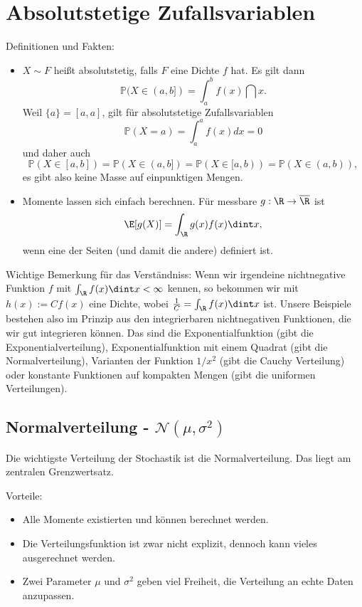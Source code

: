 \section{Absolutstetige Zufallsvariablen}
Definitionen und Fakten:
\begin{itemize}
	\item $X\sim F$ hei\ss t absolutstetig, falls $F$ eine Dichte $f$ hat. Es gilt dann $$\mathbb P(X\in (a,b])=\int_a^b f(x)\dint x.$$
	Weil $\{a\}=[a,a]$, gilt  f\"ur absolutstetige Zufallsvariablen $$\mathbb P(X=a)=\int_a^a f(x)dx=0$$ und daher auch 
 	$$ \mathbb P(X\in [a,b])=\mathbb P(X\in (a,b])=\mathbb P(X\in [a,b))=\mathbb P(X\in (a,b)),$$
	es gibt also keine Masse auf einpunktigen Mengen.
	\item Momente lassen sich einfach berechnen. F\"ur messbare $g:\R\to \overline \R$ ist
	\begin{align*}
		\E[g(X)]=\int_\R g(x) f(x) \dint x,
	\end{align*}
	wenn eine der Seiten (und damit die andere) definiert ist.
\end{itemize}

Wichtige Bemerkung f\"ur das Verst\"andniss: Wenn wir irgendeine nichtnegative Funktion $f$ mit $\int_\R f(x)\dint x<\infty$ kennen, so bekommen wir mit $h(x):= C f(x)$ eine Dichte, wobei $\frac 1 C=\int_\R f(x)\dint x$ ist. Unsere Beispiele bestehen also im Prinzip aus den integrierbaren nichtnegativen Funktionen, die wir gut integrieren k\"onnen. Das sind die Exponentialfunktion (gibt die Exponentialverteilung), Exponentialfunktion mit einem Quadrat (gibt die Normalverteilung), Varianten der Funktion $1/x^2$ (gibt die Cauchy Verteilung) oder konstante Funktionen auf kompakten Mengen (gibt die uniformen Verteilungen).

\subsection{Normalverteilung - $\mathcal N(\mu,\sigma^2)$}
Die wichtigste Verteilung der Stochastik ist die Normalverteilung. Das liegt am zentralen Grenzwertsatz. \smallskip

{Vorteile:} 
\begin{itemize}
\item Alle Momente existierten und k\"onnen berechnet werden.
\item Die Verteilungsfunktion ist zwar nicht explizit, dennoch kann vieles ausgerechnet werden.
\item	Zwei Parameter $\mu$ und $\sigma^2$ geben viel Freiheit, die Verteilung an echte Daten anzupassen. 
\end{itemize}

